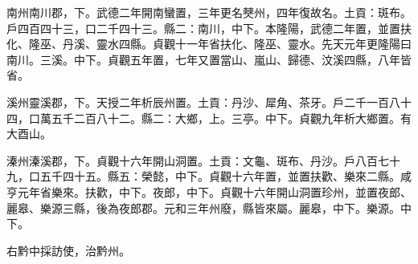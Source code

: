 \begin{pinyinscope}
 南州南川郡，下。武德二年開南蠻置，三年更名僰州，四年復故名。土貢：斑布。戶四百四十三，口二千四十三。縣二：南川，中下。本隆陽，武德二年置，並置扶化、隆巫、丹溪、靈水四縣。貞觀十一年省扶化、隆巫、靈水。先天元年更隆陽曰南川。三溪。中下。貞觀五年置，七年又置當山、嵐山、歸德、汶溪四縣，八年皆省。



 溪州靈溪郡，下。天授二年析辰州置。土貢：丹沙、犀角、茶牙。戶二千一百八十四，口萬五千二百八十二。縣二：大鄉，上。三亭。中下。貞觀九年析大鄉置。有大酉山。



 溱州溱溪郡，下。貞觀十六年開山洞置。土貢：文龜、斑布、丹沙。戶八百七十九，口五千四十五。縣五：榮懿，中下。貞觀十六年置，並置扶歡、樂來二縣。咸亨元年省樂來。扶歡，中下。夜郎，中下。貞觀十六年開山洞置珍州，並置夜郎、麗皋、樂源三縣，後為夜郎郡。元和三年州廢，縣皆來屬。麗皋，中下。樂源。中下。



 右黔中採訪使，治黔州。



\end{pinyinscope}